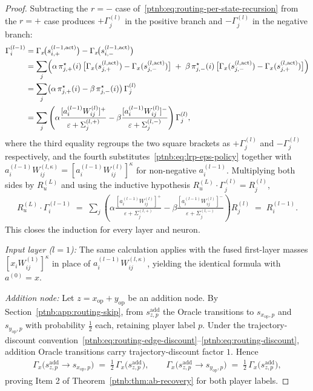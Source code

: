\begin{proof}
Subtracting the $r=-$ case of~\eqref{ptnb:eq:routing-per-state-recursion} from the $r=+$ case
produces $+\Gamma^{(l)}_j$ in the positive branch and $-\Gamma^{(l)}_j$ in the negative branch:
\begin{align}
    \Gamma^{(l-1)}_i
    &=
    \Gamma_x\!\bigl(s_{i,+}^{(l-1, \mathrm{act})}\bigr) - \Gamma_x\!\bigl(s_{i,-}^{(l-1,
    \mathrm{act})}\bigr) \nonumber \\
    &=
    \sum_j \Bigl(
    \alpha\, \pi_{j,+}^\star(i)\, \bigl[\Gamma_x(s_{j,+}^{(l,\mathrm{act})}) -
    \Gamma_x(s_{j,-}^{(l,\mathrm{act})})\bigr]
    \;+\;
    \beta\, \pi_{j,-}^\star(i)\, \bigl[\Gamma_x(s_{j,-}^{(l,\mathrm{act})}) -
    \Gamma_x(s_{j,+}^{(l,\mathrm{act})})\bigr]
    \Bigr) \nonumber \\
    &=
    \sum_j \bigl(\alpha\, \pi_{j,+}^\star(i) - \beta\, \pi_{j,-}^\star(i)\bigr)\, \Gamma^{(l)}_j
    \nonumber \\
    &=
    \sum_j \left(
    \alpha \frac{[a_i^{(l-1)} W_{ij}^{(l)}]^+}{\varepsilon + \Sigma_j^{(l,+)}}
    -
    \beta \frac{[a_i^{(l-1)} W_{ij}^{(l)}]^-}{\varepsilon + \Sigma_j^{(l,-)}}
    \right) \Gamma^{(l)}_j,
\end{align}
where the third equality regroups the two square brackets as $+\Gamma^{(l)}_j$ and
$-\Gamma^{(l)}_j$ respectively, and the fourth substitutes~\eqref{ptnb:eq:lrp-eps-policy} together with
$a_i^{(l-1)} W_{ij}^{(l,\kappa)} = [a_i^{(l-1)} W_{ij}^{(l)}]^\kappa$ for non-negative
$a_i^{(l-1)}$. Multiplying both sides by $R_u^{(L)}$ and using the inductive hypothesis $R_u^{(L)}
    \cdot \Gamma^{(l)}_j = R^{(l)}_j$,
\begin{align}
    R_u^{(L)} \cdot \Gamma^{(l-1)}_i
    \;=\; \sum_j \left(
    \alpha \frac{[a_i^{(l-1)} W_{ij}^{(l)}]^+}{\varepsilon + \Sigma_j^{(l,+)}}
    -
    \beta \frac{[a_i^{(l-1)} W_{ij}^{(l)}]^-}{\varepsilon + \Sigma_j^{(l,-)}}
    \right) R^{(l)}_j
    \;=\; R^{(l-1)}_i.
\end{align}
This closes the induction for every layer and neuron.

\emph{Input layer ($l = 1$):} The same calculation applies with the fused first-layer masses $[x_i
    W_{ij}^{(1)}]^\kappa$ in place of $a_i^{(l-1)} W_{ij}^{(l,\kappa)}$, yielding the identical formula
with $a^{(0)} = x$.

\emph{Addition node:} Let $z = x_{\mathrm{op}} + y_{\mathrm{op}}$ be an addition node. By
Section~\ref{ptnb:app:routing-skip}, from $s^{\mathrm{add}}_{z,p}$ the Oracle transitions to
$s_{x_{\mathrm{op}},p}$ and $s_{y_{\mathrm{op}},p}$ with probability $\tfrac12$ each, retaining
player label $p$. Under the trajectory-discount
convention~\eqref{ptnb:eq:routing-edge-discount}--\eqref{ptnb:eq:routing-discount}, addition Oracle
transitions carry trajectory-discount factor $1$. Hence
\begin{align}
    \Gamma_x\!\bigl(s^{\mathrm{add}}_{z,p}\to s_{x_{\mathrm{op}},p}\bigr) \;=\;
    \tfrac12\,\Gamma_x\!\bigl(s^{\mathrm{add}}_{z,p}\bigr),
    \qquad
    \Gamma_x\!\bigl(s^{\mathrm{add}}_{z,p}\to s_{y_{\mathrm{op}},p}\bigr) \;=\;
    \tfrac12\,\Gamma_x\!\bigl(s^{\mathrm{add}}_{z,p}\bigr),
\end{align}
proving Item 2 of Theorem~\ref{ptnb:thm:ab-recovery} for both player labels.


\end{proof}
